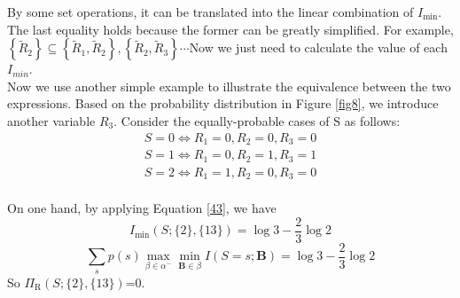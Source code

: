 By some set operations, it can be translated into the linear combination of $I_{\min}$. The last equality holds because the former can be greatly simplified. For example, $\left\{ \tilde{R}_2 \right\} \subseteq \left\{\tilde{R}_1, \tilde{R}_2 \right\},\left\{\tilde{R}_2, \tilde{R}_3 \right\}\cdots$Now we just need to calculate the value of each $I_{min}$.\\







Now we use another simple example to illustrate the equivalence between the two expressions. Based on the probability distribution in Figure \ref{fig8}, we introduce another variable $R_3$. Consider the equally-probable cases of S as follows:
\[
\begin{array}{c}
S=0 \iff {R}_1=0,{R}_2=0,{R}_3=0\\
S=1 \iff {R}_1=0,{R}_2=1,{R}_3=1\\
S=2 \iff {R}_1=1,{R}_2=0,{R}_3=0\\
\end{array}
\]

On one hand, by applying Equation \ref{43}, we have
\begin{equation}I_{\min }(S ; \{2\},\{13\})=\log3 -\frac{2}{3} \log 2\end{equation}
\begin{equation}\sum_{s} p(s) \max _{\beta \in \alpha^{-}} \min _{\mathbf{B} \in \beta} I(S=s ; \mathbf{B})=\log3 -\frac{2}{3} \log 2\end{equation}
So $\Pi_{\mathrm{R}}(S ; \{2\},\{13\})$=0.\\

